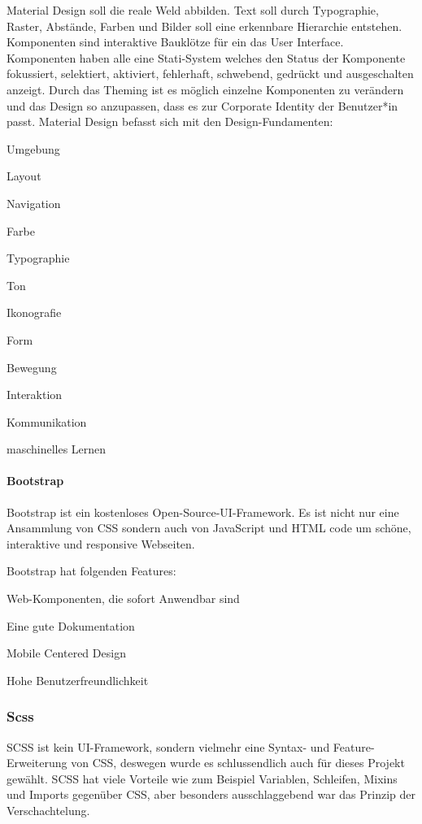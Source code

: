 Material Design soll die reale Weld abbilden.
Text soll durch Typographie, Raster, Abstände, Farben und Bilder soll eine erkennbare Hierarchie entstehen. Komponenten sind interaktive Bauklötze für ein das User Interface. Komponenten haben alle eine Stati-System welches den Status der Komponente fokussiert, selektiert, aktiviert, fehlerhaft, schwebend, gedrückt und ausgeschalten anzeigt. Durch das Theming ist es möglich einzelne Komponenten zu verändern und das Design so anzupassen, dass es zur Corporate Identity der Benutzer*in passt.
Material Design befasst sich mit den Design-Fundamenten:
\begin{compactitem}
    \item Umgebung
    \item Layout
    \item Navigation
    \item Farbe
    \item Typographie
    \item Ton
    \item Ikonografie
    \item Form
    \item Bewegung
    \item Interaktion
    \item Kommunikation
    \item maschinelles Lernen
\end{compactitem}
\cite{MaterialDesign-Introduction}

\paragraph{Bootstrap}
Bootstrap ist ein kostenloses Open-Source-UI-Framework. Es ist nicht nur eine Ansammlung von CSS sondern auch von JavaScript und HTML code um schöne, interaktive und responsive Webseiten. 

Bootstrap hat folgenden Features: 
\begin{compactitem}
    \item Web-Komponenten, die sofort Anwendbar sind
    \item Eine gute Dokumentation
    \item Mobile Centered Design
    \item Hohe Benutzerfreundlichkeit
\end{compactitem}
\cite{BestCSSFrameworksin2022}

\subsubsection{Scss}
SCSS ist kein UI-Framework, sondern vielmehr eine Syntax- und Feature-Erweiterung von CSS, deswegen wurde es schlussendlich auch für dieses Projekt gewählt. SCSS hat viele Vorteile wie zum Beispiel Variablen, Schleifen, Mixins und Imports gegenüber CSS, aber besonders ausschlaggebend war das Prinzip der Verschachtelung.


